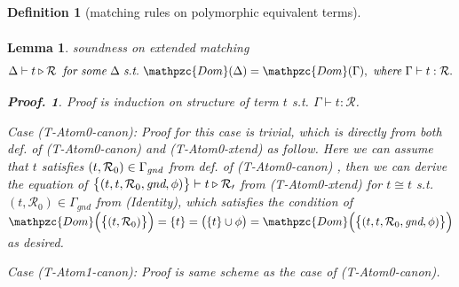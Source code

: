 \documentclass[12pt]{article}
\newtheorem{Definition}{Definition}[section]
\newtheorem{Lemma}{Lemma}[section]
\newtheorem{Proof}{Proof.}
\begin{document}
\begin{Definition}[matching rules on polymorphic equivalent terms]
\begin{displaymath}
\begin{array}{c}
    \end{array}
  \end{displaymath}
\end{Definition}


\begin{Lemma}{soundness on extended matching}
  \label{soundness_on_extended_matching}
  \[ \Delta \vdash t \triangleright \mathcal{R}\;\; \text{\it for some}\
      \Delta\ \text{\it s.t.}\
       \mathpzc{Dom}(\Delta) = \mathpzc{Dom}(\Gamma),\
        \text{\it where}\ \Gamma \vdash t : \mathcal{R}.
  \]
  \begin{Proof}
    Proof is induction on structure of term $t$ s.t.
    $\Gamma \vdash t : \mathcal{R}$.

    Case (T-Atom0-canon): Proof for this case is trivial, which is directly
    from both def. of (T-Atom0-canon) and (T-Atom0-xtend) as follow.
    Here we can assume that $t$ satisfies $(t, \mathcal{R}_0) \in
    \Gamma_\text{\it gnd}$ from def. of (T-Atom0-canon) , then we can
    derive the equation of
    $\bigl\{(t, t, \mathcal{R}_0, \text{\it gnd}, \phi) \bigr\} \vdash
    t \triangleright \mathcal{R_0}$ from (T-Atom0-xtend) for
    $t \cong t$ s.t. $(t, \mathcal{R}_0) \in \Gamma_{gnd}$ from (Identity),
    which satisfies the condition of
    $\mathpzc{Dom}\Bigl(\bigl\{(t, \mathcal{R}_0 ) \bigr\} \Bigr) =
    \{t\} = \bigl(\{t\} \cup \phi \bigr) =
    \mathpzc{Dom}\Bigl(\bigl\{(t, t, \mathcal{R}_0, \text{\it gnd}, \phi)
    \bigr\} \Bigr)$ as desired.
    
    Case (T-Atom1-canon): Proof is same scheme as the case of
    (T-Atom0-canon).
    

\end{Proof}
\end{Lemma}
\end{document}
